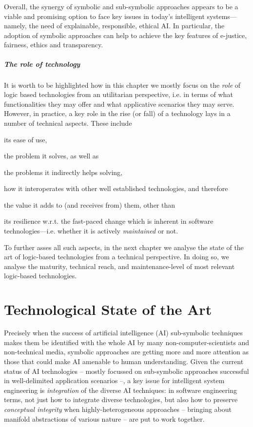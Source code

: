 \documentclass[12pt,a4paper,openright,twoside]{book}
\begin{document}
Overall, the synergy of symbolic and sub-symbolic approaches appears to be a viable and promising option to face key issues in today's intelligent systems---namely, the need of explainable, responsible, ethical AI.
%
In particular, the adoption of symbolic approaches can help to achieve the key features of e-justice, fairness, ethics and transparency.

\paragraph{The role of technology}

It is worth to be highlighted how in this chapter we mostly focus on the \emph{role} of logic based technologies from an utilitarian perspective, i.e. in terms of what functionalities they may offer and what applicative scenarios they may serve.
%
However, in practice, a key role in the rise (or fall) of a technology lays in a number of technical aspects.
%
These include
%
\begin{inlinelist}
    \item its ease of use,
    \item the problem it solves, as well as
    \item the problems it indirectly helps solving,
    \item how it interoperates with other well established technologies, and therefore
    \item the value it adds to (and receives from) them, other than
    \item its resilience w.r.t. the fast-paced change which is inherent in software technologies---i.e. whether it is actively \emph{maintained} or not.
\end{inlinelist}

To further asses all such aspects, in the next chapter we analyse the state of the art of logic-based technologies from a technical perspective.
%
In doing so, we analyse the maturity, technical reach, and maintenance-level of most relevant logic-based technologies.

\chapter{Technological State of the Art}


Precisely when the success of artificial intelligence (AI) sub-symbolic techniques makes them be identified with the whole AI by many non-computer-scientists and non-technical media, symbolic approaches are getting more and more attention as those that could make AI amenable to human understanding.
%
Given the current status of AI technologies -- mostly focussed on sub-symbolic approaches successful in well-delimited application scenarios --, a key issue for intelligent system engineering is \emph{integration} of the diverse AI techniques: in software engineering terms, not just how to integrate diverse technologies, but also how to preserve \emph{conceptual integrity} when highly-heterogeneous approaches -- bringing about manifold abstractions of various nature -- are put to work together.
\end{document}

